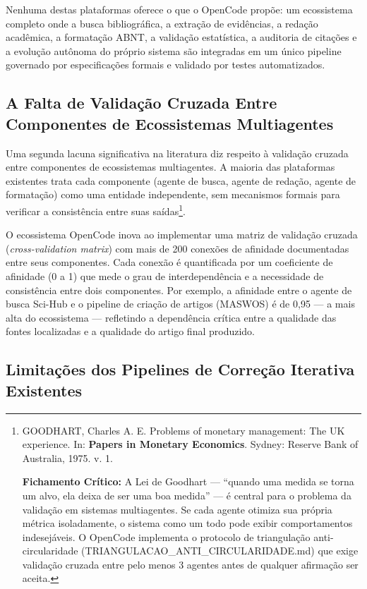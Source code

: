 Nenhuma destas plataformas oferece o que o OpenCode propõe: um ecossistema completo onde a busca bibliográfica, a extração de evidências, a redação acadêmica, a formatação ABNT, a validação estatística, a auditoria de citações e a evolução autônoma do próprio sistema são integradas em um único pipeline governado por especificações formais e validado por testes automatizados.

\subsection{A Falta de Validação Cruzada Entre Componentes de Ecossistemas Multiagentes}

Uma segunda lacuna significativa na literatura diz respeito à validação cruzada entre componentes de ecossistemas multiagentes. A maioria das plataformas existentes trata cada componente (agente de busca, agente de redação, agente de formatação) como uma entidade independente, sem mecanismos formais para verificar a consistência entre suas saídas\footnote{
  GOODHART, Charles A. E. Problems of monetary management: The UK experience. In: \textbf{Papers in Monetary Economics}. Sydney: Reserve Bank of Australia, 1975. v. 1.

  \textbf{Fichamento Crítico:} A Lei de Goodhart --- ``quando uma medida se torna um alvo, ela deixa de ser uma boa medida'' --- é central para o problema da validação em sistemas multiagentes. Se cada agente otimiza sua própria métrica isoladamente, o sistema como um todo pode exibir comportamentos indesejáveis. O OpenCode implementa o protocolo de triangulação anti-circularidade (TRIANGULACAO\-\_ANTI\-\_CIRCULARIDADE.md) que exige validação cruzada entre pelo menos 3 agentes antes de qualquer afirmação ser aceita.
}.

O ecossistema OpenCode inova ao implementar uma matriz de validação cruzada (\textit{cross-validation matrix}) com mais de 200 conexões de afinidade documentadas entre seus componentes. Cada conexão é quantificada por um coeficiente de afinidade (0 a 1) que mede o grau de interdependência e a necessidade de consistência entre dois componentes. Por exemplo, a afinidade entre o agente de busca Sci-Hub e o pipeline de criação de artigos (MASWOS) é de 0,95 --- a mais alta do ecossistema --- refletindo a dependência crítica entre a qualidade das fontes localizadas e a qualidade do artigo final produzido.

\subsection{Limitações dos Pipelines de Correção Iterativa Existentes}

